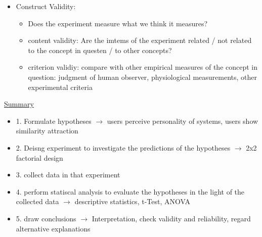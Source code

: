\documentclass[a4paper,10pt,oneside]{article}
\begin{document}
\begin{itemize}
\begin{itemize}
\begin{itemize}
			 		\end{itemize}
			 	\item Construct Validity:
			 		\begin{itemize}
			 			\item Does the experiment measure what we think it measures?
			 			\item content validity: Are the imtems of the experiment related / not related to the concept in questen / to other concepts?
			 			\item criterion validiy: compare with other empirical measures of the concept in question: judgment of human observer, physiological measurements, other experimental criteria
			 		\end{itemize}
			 \end{itemize}
	\end{itemize}

\underline{Summary} \\
 	\begin{itemize}
 		\item 1. Formulate hypotheses $\rightarrow$ users perceive personality of systems, users show similarity attraction 
 		\item 2. Deisng experiment to investigate the predictions of the hypotheses $\rightarrow$ 2x2 factorial design
 		\item 3. collect data in that experiment
 		\item 4. perform statiscal analysis to evaluate the hypotheses in the light of the collected data $\rightarrow$ descriptive statistics, t-Test, ANOVA
 		\item 5. draw conclusions $\rightarrow$ Interpretation, check validity and reliability, regard alternative explanations
 	\end{itemize}
 		

 
\end{document}
